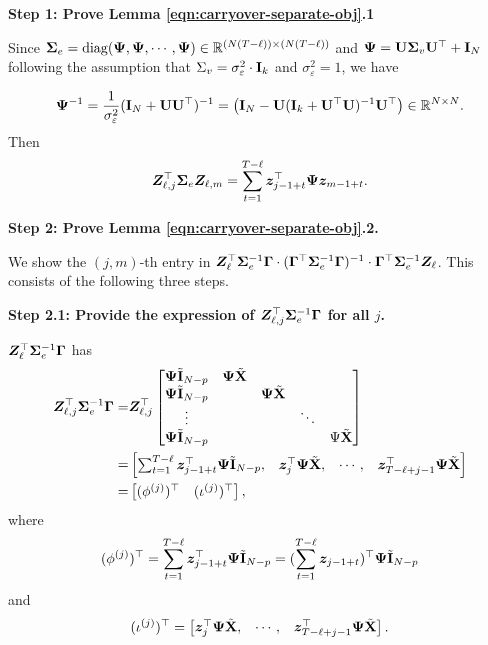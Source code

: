      \textbf{Step 1: Prove Lemma \ref{eqn:carryover-separate-obj}.1}
     
    Since $\bm{\Sigma}_e = \mathrm{diag}(\bm{\Psi}, \bm{\Psi}, \cdots, \bm{\Psi}) \in \mathbb{R}^{(N(T - \ell)) \times (N(T - \ell))}$ and $\bm{\Psi} = \mathbf{U} \mathbf{\Sigma}_v \mathbf{U}^\top +\mathbf{I}_N $ following the assumption that $\Sigma_v = \sigma_\varepsilon^2 \cdot \mathbf{I}_k$ and $\sigma_\varepsilon^2 = 1$, we have 
         
         \[\bm{\Psi}^{-1}  = \frac{1}{\sigma_\varepsilon^2 } (\mathbf{I}_N + \mathbf{U} \mathbf{U}^\top)^{-1} = \left( \mathbf{I}_N - \mathbf{U}(\mathbf{I}_k + \mathbf{U}^\top \mathbf{U})^{-1} \mathbf{U}^\top  \right)\in \mathbb{R}^{N \times N}. \]
         Then 
         \[\bm{Z}_{\ell,j}^\top \bm{\Sigma}_e  \bm{Z}_{\ell,m} = \sum_{t=1}^{T-\ell} \bm{z}_{j-1+t}^\top \bm{\Psi} \bm{z}_{m-1+t}.  \]

    \textbf{Step 2: Prove Lemma \ref{eqn:carryover-separate-obj}.2.}
    
    We show the $(j,m)$-th entry in $\bm{Z}_\ell^\top  \bm{\Sigma}^{-1}_e  \bm{\Gamma} \cdot (\bm{\Gamma}^\top \bm{\Sigma}^{-1}_e  \bm{\Gamma})^{-1} \cdot \bm{\Gamma}^\top \bm{\Sigma}^{-1}_e  \bm{Z}_\ell $. This consists of the following three steps. 

    \textbf{Step 2.1: Provide the expression of $\bm{Z}_{\ell,j}^\top \bm{\Sigma}_e^{-1} \bm{\Gamma}$ for all $j$.}
    
    $\bm{Z}_{\ell}^\top \bm{\Sigma}_e^{-1} \bm{\Gamma}$ has
		\begin{align*}
		    \bm{Z}_{\ell,j}^\top \bm{\Sigma}_e^{-1} \bm{\Gamma} =&  \bm{Z}_{\ell,j}^\top \begin{bmatrix} \bm{\Psi}  \tilde{\mathbf{I}}_{N-p} & \bm{\Psi} \tilde{\mathbf{X}} \\ \bm{\Psi} \tilde{\mathbf{I}}_{N-p} & & \bm{\Psi} \tilde{\mathbf{X}} \\ \vdots  & & & \ddots  \\ \bm{\Psi} \tilde{\mathbf{I}}_{N-p} && & &\Psi \tilde{\mathbf{X}} \end{bmatrix} \\ =&
		\begin{bmatrix} \sum_{t=1}^{T - \ell} \bm{z}_{j-1+t}^\top \bm{\Psi} \tilde{\mathbf{I}}_{N-p},  & \bm{z}_j^\top \bm{\Psi} \tilde{\mathbf{X}}, & \cdots, &  \bm{z}_{T - \ell+j-1}^\top \bm{\Psi} \tilde{\mathbf{X}} \end{bmatrix} \\ =& \begin{bmatrix}
		(\phi^{(j)})^\top & (\iota^{(j)})^\top
		\end{bmatrix}, 
		\end{align*}
		where
  \[(\phi^{(j)})^\top = \sum_{t=1}^{T - \ell} \bm{z}_{j-1+t}^\top \bm{\Psi} \tilde{\mathbf{I}}_{N-p}  = (\sum_{t=1}^{T - \ell} \bm{z}_{j-1+t})^\top \bm{\Psi} \tilde{\mathbf{I}}_{N-p} \]
  and
  \[(\iota^{(j)})^\top = \begin{bmatrix}
		\bm{z}_j^\top \bm{\Psi} \tilde{\mathbf{X}}, & \cdots, &  \bm{z}_{T - \ell+j-1}^\top \bm{\Psi} \tilde{\mathbf{X}}
		\end{bmatrix}. \]
		

